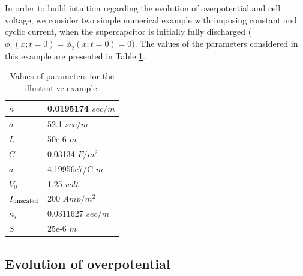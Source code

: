 \documentclass[]{article}
\begin{document}
In order to build intuition regarding the evolution of overpotential and cell voltage, we consider two simple numerical example with imposing constant and cyclic current, when the supercapcitor is initially fully discharged ($\phi_1(x;t=0) = \phi_2(x;t=0)=0$).
%
The values of the parameters considered in this example are presented in Table \ref{table:example}. 
%
%
\begin{table}[h]
\centering
\caption{Values of parameters for the illustrative example.}
\label{table:example}
\begin{tabular}{|l|l|}
\hline
$\kappa$ & 0.0195174 $sec/m$\\ \hline
$\sigma$ & 52.1  $sec/m$\\ \hline
$L$         & 50e-6  $m$\\ \hline
$C$         & 0.03134  $ F/m^2$\\ \hline
$a$         & 4.19956e7/C   $m$\\ \hline
$V_0$      & 1.25   $volt$\\ \hline
$I_{\rm unscaled}$ & 200  $Amp/m^2$\\ \hline
$\kappa_s$ & 0.0311627 $sec/m$\\ \hline
$S$         & 25e-6  $m$\\ \hline
\end{tabular}
\end{table}

\subsection{Evolution of overpotential}
\end{document}
